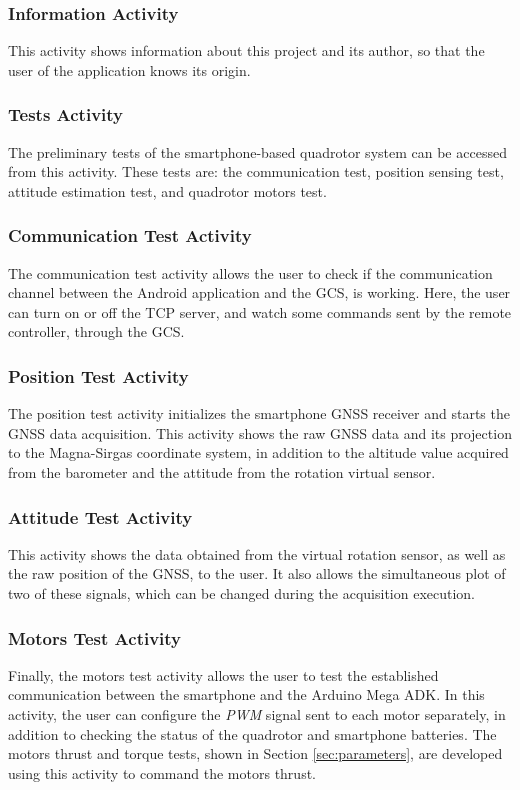 \subsubsection{Information Activity}
This activity shows information about this project and its author, so that the user of the application knows its origin.

\subsubsection{Tests Activity}
The preliminary tests of the smartphone-based quadrotor system can be accessed from this activity. These tests are: the communication test, position sensing test, attitude estimation test, and quadrotor motors test.

\subsubsection{Communication Test Activity}
The communication test activity allows the user to check if the communication channel between the Android application and the GCS, is working. Here, the user can turn on or off the TCP server, and watch some commands sent by the remote controller, through the GCS. 

\subsubsection{Position Test Activity}
The position test activity initializes the smartphone GNSS receiver and starts the GNSS data acquisition. This activity shows the raw GNSS data and its projection to the Magna-Sirgas coordinate system, in addition to the altitude value acquired from the barometer and the attitude from the rotation virtual sensor.

\subsubsection{Attitude Test Activity}
This activity shows the data obtained from the virtual rotation sensor, as well as the raw position of the GNSS, to the user. It also allows the simultaneous plot of two of these signals, which can be changed during the acquisition execution.

\subsubsection{Motors Test Activity}
Finally, the motors test activity allows the user to test the established communication between the smartphone and the Arduino Mega ADK. In this activity, the user can configure the \textit{PWM} signal sent to each motor separately, in addition to checking the status of the quadrotor and smartphone batteries. The motors thrust and torque tests, shown in Section \ref{sec:parameters}, are developed using this activity to command the motors thrust.

